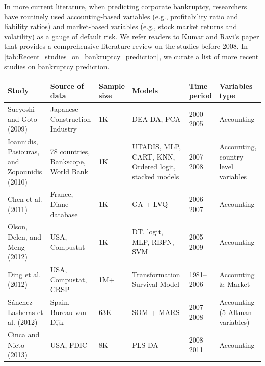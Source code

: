 In more current literature, when predicting corporate bankruptcy, researchers have routinely used accounting-based variables (e.g., profitability ratio and liability ratios) and market-based variables (e.g., stock market returns and volatility) as a gauge of default risk. We refer readers to Kumar and Ravi's paper \cite{kumar2007bankruptcy}  that provides a comprehensive literature review on the studies before 2008. In \autoref{tab:Recent_studies_on_bankruptcy_prediction}, we curate a list of more recent studies on bankruptcy prediction. 

\newpage
\begin{center}
\small
\begin{longtable}{|p{2.5cm}|p{2.5cm}|p{1.2cm}|p{3.5cm}|p{2cm}|p{2cm}|}

\hline
 Study  & Source of data & Sample size & Models & Time period & Variables type   \\ [0.5ex] 
\hline\hline

    Sueyoshi and Goto (2009)\cite{sueyoshi2009dea} & Japanese Construction Industry & 1K & DEA-DA, PCA & 2000–2005 & Accounting \\ \hline
    
    Ioannidis, Pasiouras, and Zopounidis (2010)\cite{ioannidis2010assessing} \cite{ioannidis2010assessing} & 78 countries, Bankscope, World Bank & 1K & UTADIS, MLP, CART, KNN, Ordered logit, stacked models & 2007–2008 & Accounting, country-level variables \\ \hline
    
    Chen et al. (2011)\cite{chen2011genetic} & France, Diane database & 1K & GA + LVQ & 2006–2007 & Accounting \\ \hline
    
    Olson, Delen, and Meng (2012)\cite{olson2012comparative} & USA, Compustat & 1K & DT, logit, MLP, RBFN, SVM & 2005–2009 & Accounting \\ \hline
    
    Ding et al. (2012)\cite{ding2012class} & USA, Compustat, CRSP & 1M+ & Transformation Survival Model & 1981–2006 & Accounting \& Market \\ \hline
    
    Sánchez-Lasheras et al. (2012)\cite{sanchez2012hybrid} & Spain, Bureau van Dijk & 63K & SOM + MARS & 2007–2008 & Accounting (5 Altman variables) \\ \hline
    
    Cinca and Nieto (2013)\cite{serrano2013partial} & USA, FDIC & 8K & PLS-DA & 2008–2011 & Accounting \\ \hline
    

\end{longtable}
\end{center}
